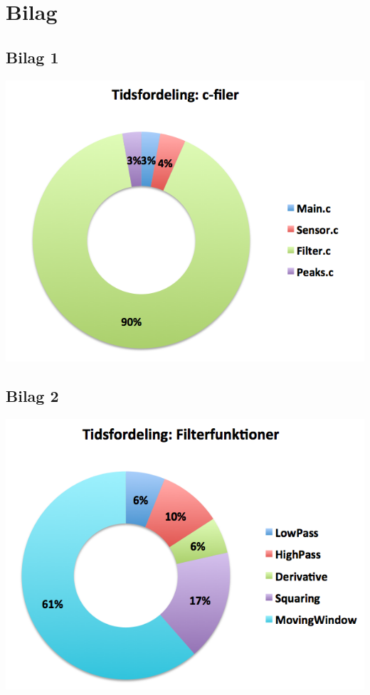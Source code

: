 \documentclass{article}
\begin{document}
\newpage
\section{Bilag}
\subsection*{Bilag 1}
\includegraphics[scale=0.47]{c-filer.png}
\subsection*{Bilag 2}
\includegraphics[scale=0.49]{filter-funktioner.png}
\end{document}
